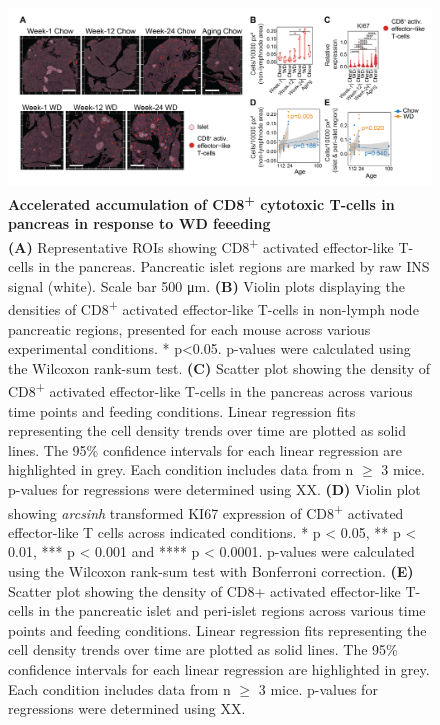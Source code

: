 \begin{figure}[!t]
\centering
\includegraphics[width=\linewidth]{Chapter4/Fig/F2-10-02.png}
\caption[res-tcells1]{\textbf{Accelerated accumulation of CD8\textsuperscript{+} cytotoxic T-cells in pancreas in response to WD feeeding}\\
\textbf{(A)} Representative ROIs showing CD8\textsuperscript{+} activated effector-like T-cells in the pancreas. Pancreatic islet regions are marked by raw INS signal (white).  Scale bar 500 μm. \textbf{(B)} Violin plots displaying the densities of CD8\textsuperscript{+} activated effector-like T-cells in non-lymph node pancreatic regions, presented for each mouse across various experimental conditions. * p<0.05. p-values were calculated using the Wilcoxon rank-sum test. \textbf{(C)} Scatter plot showing the density of CD8\textsuperscript{+} activated effector-like T-cells in the pancreas across various time points and feeding conditions. Linear regression fits representing the cell density trends over time are plotted as solid lines. The 95\% confidence intervals for each linear regression are highlighted in grey. Each condition includes data from n $\geq$ 3 mice. p-values for regressions were determined using XX. \textbf{(D)} Violin plot showing \textit{arcsinh} transformed KI67 expression of CD8\textsuperscript{+} activated effector-like T cells across indicated conditions. * p < 0.05, ** p < 0.01, *** p < 0.001 and **** p < 0.0001. p-values were calculated using the Wilcoxon rank-sum test with Bonferroni correction. \textbf{(E)} Scatter plot showing the density of CD8+ activated effector-like T-cells in the pancreatic islet and peri-islet regions across various time points and feeding conditions. Linear regression fits representing the cell density trends over time are plotted as solid lines. The 95\% confidence intervals for each linear regression are highlighted in grey. Each condition includes data from n $\geq$ 3 mice. p-values for regressions were determined using XX. 
}
\label{fig2-10}
\end{figure}


